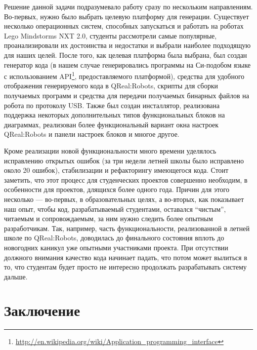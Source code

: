 \documentclass[a4paper]{article}
\begin{document}
Решение данной задачи подразумевало работу сразу по нескольким направлениям. Во-первых, нужно было выбрать целевую платформу для генерации. Существует несколько операционных систем, способных запускаться и работать на роботах Lego Mindstorms NXT 2.0, студенты рассмотрели самые популярные, проанализировали их достоинства и недостатки и выбрали наиболее подходящую для наших целей. После того, как целевая платформа была выбрана, был создан генератор кода (в нашем случае генерировались программы на Си-подобом языке с использованием API\footnote{\url{http://en.wikipedia.org/wiki/Application_programming_interface}}, предоставляемого платформой), средства для удобного отображения генерируемого кода в QReal:Robots, скрипты для сборки получаемых программ и средства для передачи получаемых бинарных файлов на робота по протоколу USB. Также был создан инсталлятор, реализована поддержка некоторых дополнительных типов функциональных блоков на диаграммах, реализован более функциональный вариант окна настроек QReal:Robots и панели настроек блоков и многое другое.

Кроме реализации новой функциональности много времени уделялось исправлению открытых ошибок (за три недели летней школы было исправлено около 20 ошибок), стабилизации и рефакторингу имеющегося кода. Стоит заметить, что этот процесс для студенческих проектов совершенно необходим, в особенности для проектов, длящихся более одного года. Причин для этого несколько --- во-первых, в образовательных целях, а во-вторых, как показывает наш опыт, чтобы код, разрабатываемый студентами, оставался ``чистым'', читаемым и сопровождаемым, за ним нужно следить более опытным разработчикам. Так, например, часть функциональности, реализованной в летней школе по QReal:Robots, доводилась до финального состояния вплоть до новогодних каникул уже опытными участниками проекта. При отсутствии должного внимания качество кода начинает падать, что потом может вылиться в то, что студентам будет просто не интересно продолжать разрабатывать систему дальше.

\section{Заключение}
\end{document}
